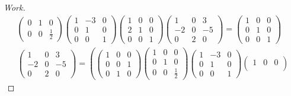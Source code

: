 \documentclass{article}
\begin{document}
\begin{proof}[Work]
\begin{align*}
\begin{pmatrix}
            0 & 1 & 0           \\
            0 & 0 & \frac{1}{2}
        \end{pmatrix}
        \begin{pmatrix}
            1 & -3 & 0 \\
            0 & 1  & 0 \\
            0 & 0  & 1
        \end{pmatrix}
        \begin{pmatrix}
            1 & 0 & 0 \\
            2 & 1 & 0 \\
            0 & 0 & 1
        \end{pmatrix}
        \begin{pmatrix}
            1  & 0 & 3  \\
            -2 & 0 & -5 \\
            0  & 2 & 0
        \end{pmatrix} =
        \begin{pmatrix}
            1 & 0 & 0 \\
            0 & 1 & 0 \\
            0 & 0 & 1
        \end{pmatrix}     \\
        \begin{pmatrix}
            1  & 0 & 3  \\
            -2 & 0 & -5 \\
            0  & 2 & 0
        \end{pmatrix} = \left(
        \begin{pmatrix}
            1 & 0 & 0 \\
            0 & 0 & 1 \\
            0 & 1 & 0
        \end{pmatrix}
        \begin{pmatrix}
            1 & 0 & 0           \\
            0 & 1 & 0           \\
            0 & 0 & \frac{1}{2}
        \end{pmatrix}
        \begin{pmatrix}
            1 & -3 & 0 \\
            0 & 1  & 0 \\
            0 & 0  & 1
        \end{pmatrix}
        \begin{pmatrix}
            1 & 0 & 0 \\

\end{pmatrix}
\end{align*}
\end{proof}
\end{document}
